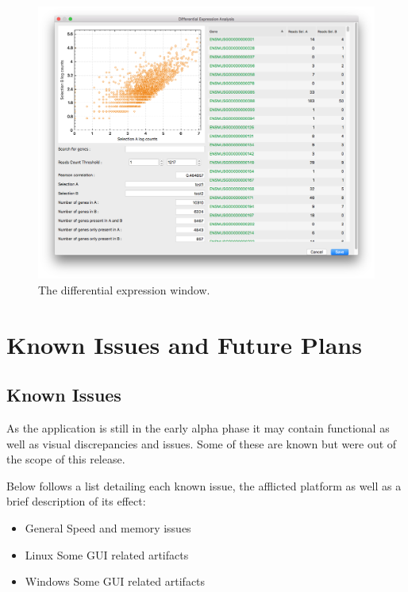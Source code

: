 \documentclass[10pt,a4paper,titlepage]{book}
\begin{document}
\begin{figure}[h]
	\centering
	\includegraphics[width=0.8\linewidth]{./Pictures/DE_view}
	\caption[The differential expression window.]{The differential expression window.}
	\label{fig:de}
\end{figure}

\chapter{Known Issues and Future Plans}
\section{Known Issues}

As the application is still in the early alpha phase it may contain functional as well as visual discrepancies and issues. Some of these are known but were out of the scope of this release.

Below follows a list detailing each known issue, the afflicted platform as well as a brief description of its effect:

\begin{itemize}
\item	General
\subitem		Speed and memory issues
\item	Linux
\subitem		Some GUI related artifacts
\item	Windows
\subitem		Some GUI related artifacts
\end{itemize}

\end{document}
